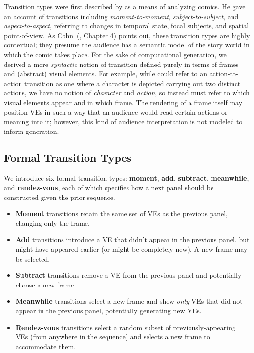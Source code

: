 Transition types were first described by  
as a means of analyzing
comics. He gave an account of transitions including {\em moment-to-moment},
{\em subject-to-subject}, and {\em aspect-to-aspect}, referring to changes
in temporal state, focal subjects, and spatial point-of-view. As 
Cohn~(\citeyear{cohn2013visual}, Chapter 4) points out, these transition types are
highly contextual; they presume the audience has a semantic model of the
story world in which the comic takes place. For the sake of
computational generation, we derived a more {\em syntactic} notion of
transition defined purely in terms of frames and (abstract) visual
elements. For example, while \citeauthor{mcCloud1993understanding} could 
refer to an action-to-action
transition as one where a character is depicted carrying out two distinct
actions, we have no notion of {\em character} and {\em action}, so instead
must refer to which visual elements appear and in which frame. The
rendering of a frame itself may position VEs in such a way that an audience
would read certain actions or meaning into it; however, this kind of
audience interpretation is not modeled to inform generation.

\subsection{Formal Transition Types}

We introduce six formal transition types: {\bf moment}, {\bf add}, {\bf
subtract}, {\bf meanwhile}, and {\bf rendez-vous}, each of which specifies
how a next panel should be constructed given the prior sequence.

\begin{itemize}
\item {\bf Moment} transitions retain the same set of VEs as the previous panel, 
changing only the frame.

\item {\bf Add} transitions introduce a VE that didn't appear in the
previous panel, but might have appeared earlier (or might be completely
new). A new frame may be selected.

\item {\bf Subtract} transitions remove a VE from the previous panel and
potentially choose a new frame.

\item {\bf Meanwhile} transitions select a new frame and show {\em only}
VEs that did not appear in the previous panel, potentially generating new
VEs.

\item {\bf Rendez-vous} transitions select a random subset of
previously-appearing VEs (from anywhere in the sequence) and selects a new
frame to accommodate them.
\end{itemize}

